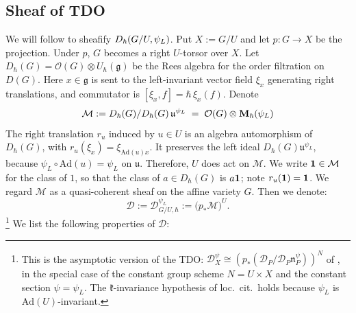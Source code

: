 \documentclass{article}
\theoremstyle{plain}
\theoremstyle{definition}
\theoremstyle{remark}
\numberwithin{equation}{section}
\begin{document}
\subsection{Sheaf of TDO}
We will follow \cite[\S\S6.3--6.4]{ginzburg2022differentialoperatorsgugelfandgraev} to sheafify $D_\hbar(G/U,\psi_L)$. Put $X:=G/U$ and let $p\colon G\to X$ be the projection. Under $p$, $G$ becomes a right $U$-torsor over $X$. Let
$D_\hbar(G)=\mathcal O(G)\otimes U_\hbar(\mathfrak g)$ be the Rees algebra for the order filtration on $D(G)$.
Here $x\in\mathfrak g$ is sent to the left-invariant vector field $\xi_x$ generating right translations, and commutator is
$[\xi_x,f]=\hbar\,\xi_x(f)$. Denote
\[
\mathcal M:=D_\hbar(G)/D_\hbar(G)\,\mathfrak u^{\psi_L}\;=\;\mathcal O(G)\otimes \mathbf{M}_\hbar(\psi_L)
\]
The right translation $r_u$ induced by $u\in U$ is an algebra automorphism of $D_\hbar(G)$, with $r_u(\xi_x)=\xi_{\mathrm{Ad}(u)x}$.
It preserves the left ideal $D_\hbar(G)\mathfrak u^{\psi_L}$, because $\psi_L\circ\mathrm{Ad}(u)=\psi_L$ on $\mathfrak u$. Therefore, $U$ does act on $\mathcal M$. We write $\mathbf 1\in\mathcal M$ for the class of $1$, so that the class of $a\in D_\hbar(G)$ is $a\mathbf 1$; note $r_u(\mathbf 1)=\mathbf 1$. We regard $\mathcal M$ as a quasi-coherent sheaf on the affine variety $G$. Then we denote:
\[
\mathcal D:=\mathcal D^{\psi_L}_{G/U,\hbar}:=\bigl(p_*\mathcal M\bigr)^U .
\]
\footnote{This is the asymptotic version of the TDO: $\mathcal D^{\psi}_X\cong(p_*(\mathcal D_P/\mathcal D_P\mathfrak n_P^\psi))^N$ of
\cite[\S6.3]{ginzburg2022differentialoperatorsgugelfandgraev}, in the special case of the constant group scheme $N=U\times X$ and the constant section $\psi=\psi_L$.
The $\mathfrak k$-invariance hypothesis of loc.\ cit.\ holds because $\psi_L$ is $\mathrm{Ad}(U)$-invariant.} We list the following properties of $\mathcal D$:
\end{document}
